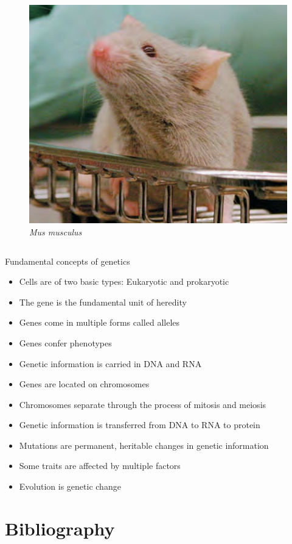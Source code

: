 \documentclass[11pt,ignorenonframetext,aspectratio=169]{beamer}
\providecommand{\tightlist}{%
  \setlength{\itemsep}{0pt}\setlength{\parskip}{0pt}}
\begin{document}
\begin{frame}{}
\begin{columns}[T,onlytextwidth]

\begin{figure}
\includegraphics[width=0.8\linewidth]{../images/model_organisms_mus} \caption{\textit{Mus musculus}}\label{fig:model-organisms-mus}
\end{figure}

\end{columns}
\end{frame}

\begin{frame}{Fundamental concepts of genetics}
\protect\hypertarget{fundamental-concepts-of-genetics}{}
\begin{itemize}[<+->]
\tightlist
\item
  Cells are of two basic types: \alert{Eukaryotic} and
  \alert{prokaryotic}
\item
  The gene is the fundamental unit of heredity
\item
  Genes come in multiple forms called alleles
\item
  Genes confer phenotypes
\item
  Genetic information is carried in DNA and RNA
\item
  Genes are located on chromosomes
\item
  Chromosomes separate through the process of mitosis and meiosis
\item
  Genetic information is transferred from DNA to RNA to protein
\item
  Mutations are permanent, heritable changes in genetic information
\item
  Some traits are affected by multiple factors
\item
  Evolution is genetic change
\end{itemize}
\end{frame}

\hypertarget{bibliography}{%
\section{Bibliography}\label{bibliography}}
\end{document}
